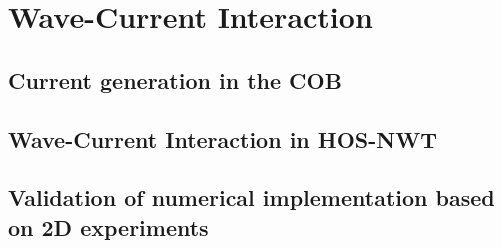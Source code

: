 \chapter{Wave-Current Interaction}\label{ch:wci}


\section{Current generation in the COB}


\section{Wave-Current Interaction in HOS-NWT}


\section{Validation of numerical implementation based on 2D experiments}

\cleardoublepage

